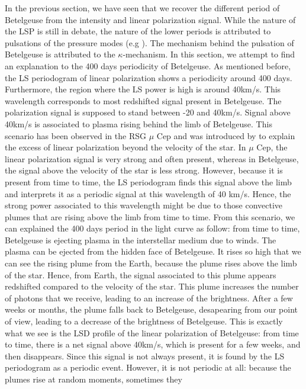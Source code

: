 \documentclass{aa}
\begin{document}
In the previous section, we have seen that we recover the different period of Betelgeuse from the intensity and linear polarization signal. 
While the nature of the LSP is still in debate, the nature of the lower periods is attributed to pulsations of the pressure modes 
(e.g \cite{kiss_variability_2006}). The mechanism behind the pulsation of Betelgeuse is attributed to the $\kappa$-mechanism. In this section, we attempt to 
find an explanation to the 400 days periodicity of Betelgeuse. As mentioned before, the LS periodogram of linear polarization shows a periodicity 
around 400 days. Furthermore, the region where the LS power is high is around 40km/s. This wavelength corresponds to most redshifted signal present in Betelgeuse.
The polarization signal is supposed to stand between -20 and 40km/s. Signal above 40km/s is associated to plasma rising behind the limb of Betelgeuse. 
This scenario has been observed in the RSG $\mu$ Cep and was introduced by \cite{lopez_ariste_height_2023} to explain the excess of linear polarization beyond 
the velocity of the star. In $\mu$ Cep, the linear polarization signal is very strong and often present, whereas in Betelgeuse, the signal above the 
velocity of the star is less strong. However, because it is present from time to time, the LS periodogram finds this signal above the limb and interprets it as a
periodic signal at this wavelength of 40 km/s. Hence, the strong power associated to this wavelength might be due to those convective plumes that are 
rising above the limb from time to time. From this scenario, we can explained the 400 days period in the light curve as follow: from time to time,
Betelgeuse is ejecting plasma in the interstellar medium due to winds. The plasma can be ejected from the hidden face of Betelgeuse. 
It rises so high that we can see the rising plume from the Earth, because the plume rises above the limb of the star. Hence, from Earth, 
the signal associated to this plume appears redshifted compared to the velocity of the star. This plume increases the number of photons that we receive,
leading to an increase of the brightness. After a few weeks or months, the plume falls back to Betelgeuse, desapearing from our point of view, 
leading to a decrease of the brightness of Betelgeuse. This is exactly what we see is the LSD profile of the linear polarization of Betelgeuse: 
from time to time, there is a net signal above 40km/s, which is present for a few weeks, and then disappears. Since this signal is not always present, 
it is found by the LS periodogram as a periodic event. However, it is not periodic at all: because the plumes rise at random moments, sometimes they 
\end{document}
